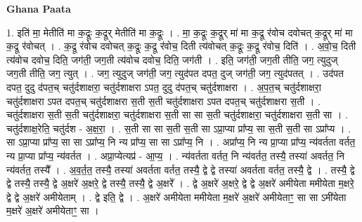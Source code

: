 \documentclass[17pt]{extarticle}
\begin{document}
\textbf{Ghana Paata } \newline

1. इति॑ मा॒ मेतीति॑ मा क॒द्रूः क॒द्रूर् मेतीति॑ मा क॒द्रूः । . मा॒ क॒द्रूः क॒द्रूर् मा॑ मा क॒द्रू र॑वोच दवोचत् क॒द्रूर् मा॑ मा क॒द्रू र॑वोचत् । . क॒द्रू र॑वोच दवोचत् क॒द्रूः क॒द्रू र॑वोच॒ दिती त्य॑वोचत् क॒द्रूः क॒द्रू र॑वोच॒ दिति॑ । . अ॒वो॒च॒ दिती त्य॑वोच दवोच॒ दिति॒ जग॑ती॒ जग॒ती त्य॑वोच दवोच॒ दिति॒ जग॑ती । . इति॒ जग॑ती॒ जग॒ती तीति॒ जग॒ त्युदुज् जग॒ती तीति॒ जग॒ त्युत् । . जग॒ त्युदुज् जग॑ती॒ जग॒ त्युद॑पत दपत॒ दुज् जग॑ती॒ जग॒ त्युद॑पतत् । . उद॑पत दपत॒ दुदु द॑पत॒च् चतु॑र्दशाक्षरा॒ चतु॑र्दशाक्षरा ऽपत॒ दुदु द॑पत॒च् चतु॑र्दशाक्षरा । . अ॒प॒त॒च् चतु॑र्दशाक्षरा॒ चतु॑र्दशाक्षरा ऽपत दपत॒च् चतु॑र्दशाक्षरा स॒ती स॒ती चतु॑र्दशाक्षरा ऽपत दपत॒च् चतु॑र्दशाक्षरा स॒ती । . चतु॑र्दशाक्षरा स॒ती स॒ती चतु॑र्दशाक्षरा॒ चतु॑र्दशाक्षरा स॒ती सा सा स॒ती चतु॑र्दशाक्षरा॒ चतु॑र्दशाक्षरा स॒ती सा । . चतु॑र्दशाक्ष॒रेति॒ चतु॑र्दश - अ॒क्ष॒रा॒ । . स॒ती सा सा स॒ती स॒ती सा ऽप्रा॒प्या प्रा᳚प्य॒ सा स॒ती स॒ती सा ऽप्रा᳚प्य । . सा ऽप्रा॒प्या प्रा᳚प्य॒ सा सा ऽप्रा᳚प्य॒ नि न्य प्रा᳚प्य॒ सा सा ऽप्रा᳚प्य॒ नि । . अप्रा᳚प्य॒ नि न्य प्रा॒प्या प्रा᳚प्य॒ न्य॑वर्तता वर्तत॒ न्य प्रा॒प्या प्रा᳚प्य॒ न्य॑वर्तत । . अप्रा॒प्येत्यप्र॑ - आ॒प्य॒ । . न्य॑वर्तता वर्तत॒ नि न्य॑वर्तत॒ तस्यै॒ तस्या॑ अवर्तत॒ नि न्य॑वर्तत॒ तस्यै᳚ । . अ॒व॒र्त॒त॒ तस्यै॒ तस्या॑ अवर्तता वर्तत॒ तस्यै॒ द्वे द्वे तस्या॑ अवर्तता वर्तत॒ तस्यै॒ द्वे । . तस्यै॒ द्वे द्वे तस्यै॒ तस्यै॒ द्वे अ॒क्षरे॑ अ॒क्षरे॒ द्वे तस्यै॒ तस्यै॒ द्वे अ॒क्षरे᳚ । . द्वे अ॒क्षरे॑ अ॒क्षरे॒ द्वे द्वे अ॒क्षरे॑ अमीयेता ममीयेता म॒क्षरे॒ द्वे द्वे अ॒क्षरे॑ अमीयेताम् । . द्वे इति॒ द्वे । . अ॒क्षरे॑ अमीयेता ममीयेता म॒क्षरे॑ अ॒क्षरे॑ अमीयेताꣳ॒॒ सा सा ऽमी॑येता म॒क्षरे॑ अ॒क्षरे॑ अमीयेताꣳ॒॒ सा । \newline
\end{document}
